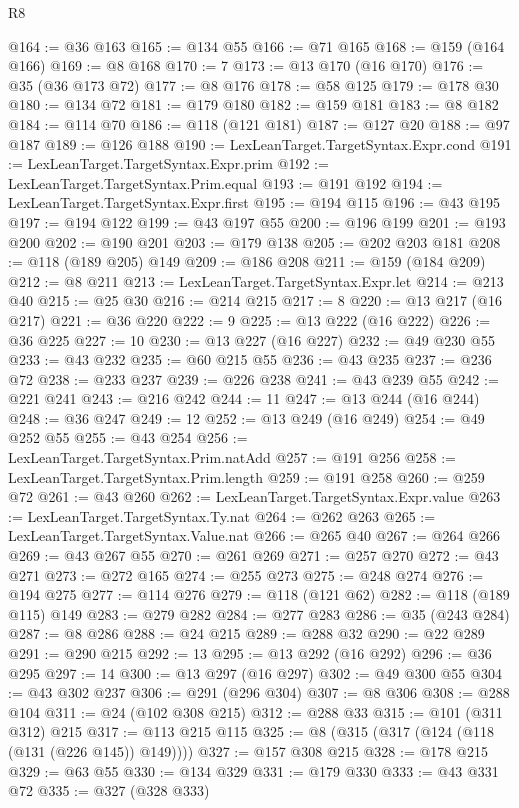 \begin{lexlean}{R8}
\begin{coremodule}
{{{{{{{{{{{{{{{{{{{{{{{{{{{{{{{{{{{{{{{{{{{{{@164 := @36 @163
@165 := @134 @55
@166 := @71 @165
@168 := @159 (@164 @166)
@169 := @8 @168
@170 := 7
@173 := @13 @170 (@16 @170)
@176 := @35 (@36 @173 @72)
@177 := @8 @176
@178 := @58 @125
@179 := @178 @30
@180 := @134 @72
@181 := @179 @180
@182 := @159 @181
@183 := @8 @182
@184 := @114 @70
@186 := @118 (@121 @181)
@187 := @127 @20
@188 := @97 @187
@189 := @126 @188
@190 := LexLeanTarget.TargetSyntax.Expr.cond
@191 := LexLeanTarget.TargetSyntax.Expr.prim
@192 := LexLeanTarget.TargetSyntax.Prim.equal
@193 := @191 @192
@194 := LexLeanTarget.TargetSyntax.Expr.first
@195 := @194 @115
@196 := @43 @195
@197 := @194 @122
@199 := @43 @197 @55
@200 := @196 @199
@201 := @193 @200
@202 := @190 @201
@203 := @179 @138
@205 := @202 @203 @181
@208 := @118 (@189 @205) @149
@209 := @186 @208
@211 := @159 (@184 @209)
@212 := @8 @211
@213 := LexLeanTarget.TargetSyntax.Expr.let
@214 := @213 @40
@215 := @25 @30
@216 := @214 @215
@217 := 8
@220 := @13 @217 (@16 @217)
@221 := @36 @220
@222 := 9
@225 := @13 @222 (@16 @222)
@226 := @36 @225
@227 := 10
@230 := @13 @227 (@16 @227)
@232 := @49 @230 @55
@233 := @43 @232
@235 := @60 @215 @55
@236 := @43 @235
@237 := @236 @72
@238 := @233 @237
@239 := @226 @238
@241 := @43 @239 @55
@242 := @221 @241
@243 := @216 @242
@244 := 11
@247 := @13 @244 (@16 @244)
@248 := @36 @247
@249 := 12
@252 := @13 @249 (@16 @249)
@254 := @49 @252 @55
@255 := @43 @254
@256 := LexLeanTarget.TargetSyntax.Prim.natAdd
@257 := @191 @256
@258 := LexLeanTarget.TargetSyntax.Prim.length
@259 := @191 @258
@260 := @259 @72
@261 := @43 @260
@262 := LexLeanTarget.TargetSyntax.Expr.value
@263 := LexLeanTarget.TargetSyntax.Ty.nat
@264 := @262 @263
@265 := LexLeanTarget.TargetSyntax.Value.nat
@266 := @265 @40
@267 := @264 @266
@269 := @43 @267 @55
@270 := @261 @269
@271 := @257 @270
@272 := @43 @271
@273 := @272 @165
@274 := @255 @273
@275 := @248 @274
@276 := @194 @275
@277 := @114 @276
@279 := @118 (@121 @62)
@282 := @118 (@189 @115) @149
@283 := @279 @282
@284 := @277 @283
@286 := @35 (@243 @284)
@287 := @8 @286
@288 := @24 @215
@289 := @288 @32
@290 := @22 @289
@291 := @290 @215
@292 := 13
@295 := @13 @292 (@16 @292)
@296 := @36 @295
@297 := 14
@300 := @13 @297 (@16 @297)
@302 := @49 @300 @55
@304 := @43 @302 @237
@306 := @291 (@296 @304)
@307 := @8 @306
@308 := @288 @104
@311 := @24 (@102 @308 @215)
@312 := @288 @33
@315 := @101 (@311 @312) @215
@317 := @113 @215 @115
@325 := @8 (@315 (@317 (@124 (@118 (@131 (@226 @145)) @149))))
@327 := @157 @308 @215
@328 := @178 @215
@329 := @63 @55
@330 := @134 @329
@331 := @179 @330
@333 := @43 @331 @72
@335 := @327 (@328 @333)
}}}}}}}}}}}}}}}}}}}}}}}}}}}}}}}}}}}}}}}}}}}}}
\end{coremodule}
\end{lexlean}
